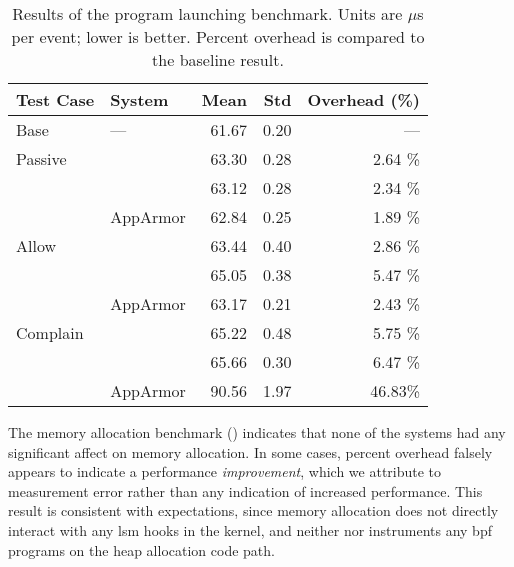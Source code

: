 \begingroup\small
\begin{longtable}[c]{llrrr}
  \caption[Results of the program launching benchmark]{
    Results of the program launching benchmark. Units are $\mu$s per event; lower is
    better. Percent overhead is compared to the baseline result.
  }%
  \label{tab:phoronix-launch-programs}\\
  \toprule
   Test Case & System         &  Mean & Std  & Overhead (\%)\\
   \midrule
   Base      & ---            & 61.67 & 0.20 & ---     \\
   \midrule
   Passive   & \bpfbox{}      & 63.30 & 0.28 & 2.64 \% \\
             & \bpfcontain{}  & 63.12 & 0.28 & 2.34 \% \\
             & AppArmor       & 62.84 & 0.25 & 1.89 \% \\
   \midrule
   Allow     & \bpfbox{}      & 63.44 & 0.40 & 2.86 \% \\
             & \bpfcontain{}  & 65.05 & 0.38 & 5.47 \% \\
             & AppArmor       & 63.17 & 0.21 & 2.43 \% \\
   \midrule
   Complain  & \bpfbox{}      & 65.22 & 0.48 & 5.75 \% \\
             & \bpfcontain{}  & 65.66 & 0.30 & 6.47 \% \\
             & AppArmor       & 90.56 & 1.97 & 46.83\% \\
  \bottomrule
\end{longtable}
\endgroup

The memory allocation benchmark () indicates that none of the
systems had any significant affect on memory allocation. In some cases, percent overhead
falsely appears to indicate a performance \textit{improvement}, which we attribute to
measurement error rather than any indication of increased performance. This result is
consistent with expectations, since memory allocation does not directly interact with any
\gls{lsm} hooks in the kernel, and neither \bpfbox{} nor \bpfcontain{} instruments any
\gls{bpf} programs on the heap allocation code path.

